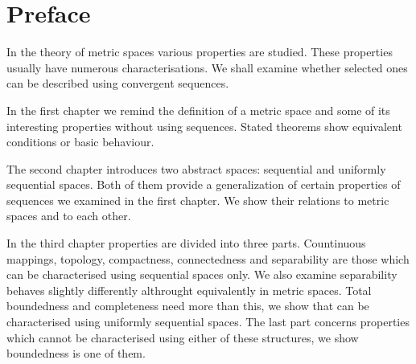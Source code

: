 \chapter*{Preface}

In the theory of metric spaces various properties are studied. These properties usually have numerous characterisations. We shall examine whether selected ones can be described using convergent sequences.

In the first chapter we remind the definition of a metric space and some of its interesting properties without using sequences. Stated theorems show equivalent conditions or basic behaviour. 

The second chapter introduces two abstract spaces: sequential and uniformly sequential spaces. Both of them provide a generalization of certain properties of sequences we examined in the first chapter.  We show their relations to metric spaces and to each other.

In the third chapter properties are divided into three parts. Countinuous mappings, topology, compactness, connectedness and separability are those which can be characterised using sequential spaces only. We also examine separability behaves slightly differently althrought equivalently in metric spaces. Total boundedness and completeness need more than this, we show that can be characterised using uniformly sequential spaces. The last part concerns properties which cannot be characterised using either of these structures, we show boundedness is one of them.